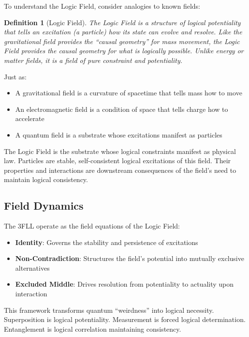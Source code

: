 \documentclass[12pt,a4paper]{article}
\newtheorem{definition}{Definition}
\begin{document}
To understand the Logic Field, consider analogies to known fields:

\begin{definition}[Logic Field]
The Logic Field is a structure of logical potentiality that tells an excitation (a particle) how its state can evolve and resolve. Like the gravitational field provides the ``causal geometry'' for mass movement, the Logic Field provides the causal geometry for what is logically possible. Unlike energy or matter fields, it is a field of pure constraint and potentiality.
\end{definition}

Just as:
\begin{itemize}
\item A gravitational field is a curvature of spacetime that tells mass how to move
\item An electromagnetic field is a condition of space that tells charge how to accelerate
\item A quantum field is a substrate whose excitations manifest as particles
\end{itemize}

The Logic Field is the substrate whose logical constraints manifest as physical law. Particles are stable, self-consistent logical excitations of this field. Their properties and interactions are downstream consequences of the field's need to maintain logical consistency.

\subsection{Field Dynamics}

The 3FLL operate as the field equations of the Logic Field:

\begin{itemize}
\item \textbf{Identity}: Governs the stability and persistence of excitations
\item \textbf{Non-Contradiction}: Structures the field's potential into mutually exclusive alternatives
\item \textbf{Excluded Middle}: Drives resolution from potentiality to actuality upon interaction
\end{itemize}

This framework transforms quantum ``weirdness'' into logical necessity. Superposition is logical potentiality. Measurement is forced logical determination. Entanglement is logical correlation maintaining consistency.
\end{document}
